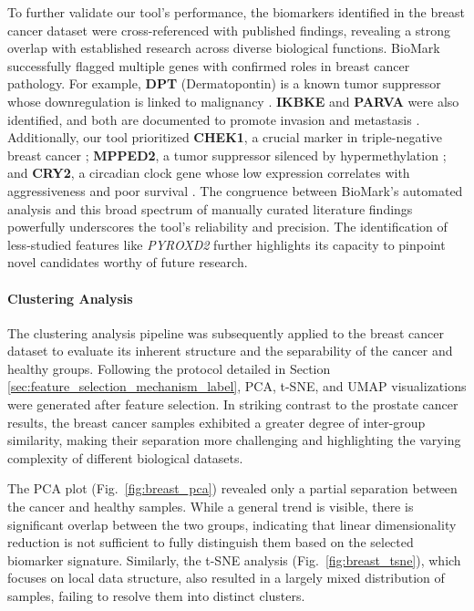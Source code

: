 \documentclass[journal]{IEEEtran}
\begin{document}
To further validate our tool's performance, the biomarkers identified in the breast cancer dataset were cross-referenced with published findings, revealing a strong overlap with established research across diverse biological functions. BioMark successfully flagged multiple genes with confirmed roles in breast cancer pathology. For example, \textbf{DPT} (Dermatopontin) is a known tumor suppressor whose downregulation is linked to malignancy \cite{DPT_suppressor_2023}. \textbf{IKBKE} and \textbf{PARVA} were also identified, and both are documented to promote invasion and metastasis \cite{IKBKE_metastasis_2022, PARVA_metastasis_2019}. Additionally, our tool prioritized \textbf{CHEK1}, a crucial marker in triple-negative breast cancer \cite{CHEK1_TNBC_2022}; \textbf{MPPED2}, a tumor suppressor silenced by hypermethylation \cite{MPPED2_suppressor_2019}; and \textbf{CRY2}, a circadian clock gene whose low expression correlates with aggressiveness and poor survival \cite{CRY2_circadian_2015}. The congruence between BioMark's automated analysis and this broad spectrum of manually curated literature findings powerfully underscores the tool's reliability and precision. The identification of less-studied features like \textit{PYROXD2} further highlights its capacity to pinpoint novel candidates worthy of future research.


\paragraph{Clustering Analysis}
The clustering analysis pipeline was subsequently applied to the breast cancer dataset to evaluate its inherent structure and the separability of the cancer and healthy groups. Following the protocol detailed in Section \ref{sec:feature_selection_mechanism_label}, PCA, t-SNE, and UMAP visualizations were generated after feature selection. In striking contrast to the prostate cancer results, the breast cancer samples exhibited a greater degree of inter-group similarity, making their separation more challenging and highlighting the varying complexity of different biological datasets. 

The PCA plot (Fig.~\ref{fig:breast_pca}) revealed only a partial separation between the cancer and healthy samples. While a general trend is visible, there is significant overlap between the two groups, indicating that linear dimensionality reduction is not sufficient to fully distinguish them based on the selected biomarker signature. Similarly, the t-SNE analysis (Fig.~\ref{fig:breast_tsne}), which focuses on local data structure, also resulted in a largely mixed distribution of samples, failing to resolve them into distinct clusters.
\end{document}
